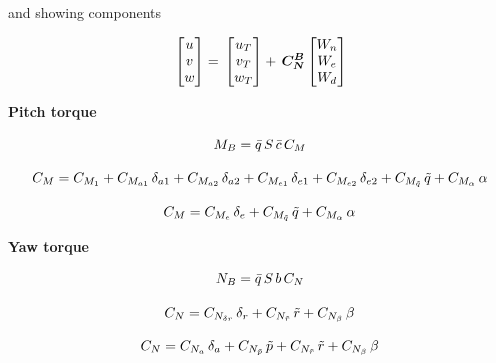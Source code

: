 and showing components

\begin{equation}{\label{eqn:inertialVelocityAirspeedVectorWindComponents}}
\begin{bmatrix}
u \\
v\\
w\\
\end{bmatrix}
=\,
\begin{bmatrix}
u_{T} \\
v_{T}\\
w_{T}\\
\end{bmatrix}
+\,
\bm{C_N^B}
\begin{bmatrix}
W_n \\
W_e\\
W_d\\
\end{bmatrix}
\end{equation}


\textbf{Pitch torque}

\begin{equation}{\label{eqn:pitchTorque}}
M_B = \bar{q} \, S \, \bar{c} \, C_M
\end{equation}

\begin{equation}{\label{eqn:bigCraftC_M}}
C_M = C_{M_{1}} + C_{M_{a1}} \, \delta_{a1} + C_{M_{a2}} \, \delta_{a2} + C_{M_{e1}} \, \delta_{e1} + C_{M_{e2}} \, \delta_{e2} + C_{M_{\tilde{q}}} \, \tilde{q} +  C_{M_\alpha} \, \alpha 
\end{equation}

\begin{equation}{\label{eqn:makoC_M}}
C_M =  C_{M_{e}} \, \delta_{e} + C_{M_{\tilde{q}}} \, \tilde{q} +  C_{M_\alpha} \, \alpha 
\end{equation}

\textbf{Yaw torque}

\begin{equation}{\label{eqn:yawTorque}}
N_B = \bar{q} \, S \, b \, C_N \\
\end{equation}


\begin{equation}{\label{eqn:bigCraftC_N}}
C_N= C_{N_{\delta r}} \, \delta_{r} + C_{N_{\tilde{r}}} \, \tilde{r} +  C_{N_\beta} \, \beta 
\end{equation}

\begin{equation}{\label{eqn:makoC_N}}
C_N= C_{N_{a}} \, \delta_{a} + C_{N_{\tilde{p}}} \, \tilde{p} + C_{N_{\tilde{r}}} \, \tilde{r} +  C_{N_\beta} \, \beta 
\end{equation}

